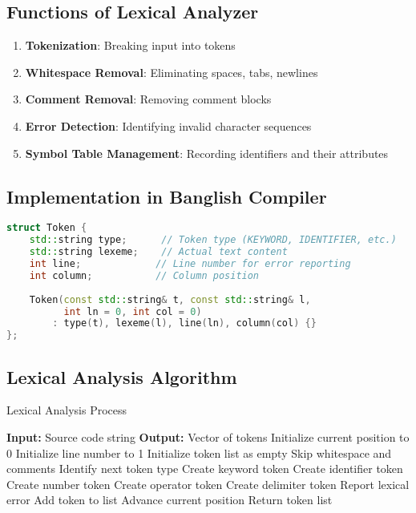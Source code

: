\documentclass[12pt,a4paper]{article}
\begin{document}
\subsection{Functions of Lexical Analyzer}

\begin{enumerate}
    \item \textbf{Tokenization}: Breaking input into tokens
    \item \textbf{Whitespace Removal}: Eliminating spaces, tabs, newlines
    \item \textbf{Comment Removal}: Removing comment blocks
    \item \textbf{Error Detection}: Identifying invalid character sequences
    \item \textbf{Symbol Table Management}: Recording identifiers and their attributes
\end{enumerate}

\subsection{Implementation in Banglish Compiler}

\begin{lstlisting}[language=C++, caption=Token Structure Implementation]
struct Token {
    std::string type;      // Token type (KEYWORD, IDENTIFIER, etc.)
    std::string lexeme;    // Actual text content
    int line;             // Line number for error reporting
    int column;           // Column position
    
    Token(const std::string& t, const std::string& l, 
          int ln = 0, int col = 0)
        : type(t), lexeme(l), line(ln), column(col) {}
};
\end{lstlisting}

\subsection{Lexical Analysis Algorithm}

\begin{algorithm}[H]
\caption{Lexical Analysis Process}
\begin{algorithmic}[1]
\State \textbf{Input:} Source code string
\State \textbf{Output:} Vector of tokens
\State
\State Initialize current position to 0
\State Initialize line number to 1
\State Initialize token list as empty
\State
{}
    \State Skip whitespace and comments
    \State Identify next token type
        \State Create keyword token
        \State Create identifier token
        \State Create number token
        \State Create operator token
        \State Create delimiter token
    \Else
        \State Report lexical error
    \EndIf
    \State Add token to list
    \State Advance current position
\EndWhile
\State Return token list
\end{algorithmic}
\end{algorithm}
\end{document}
